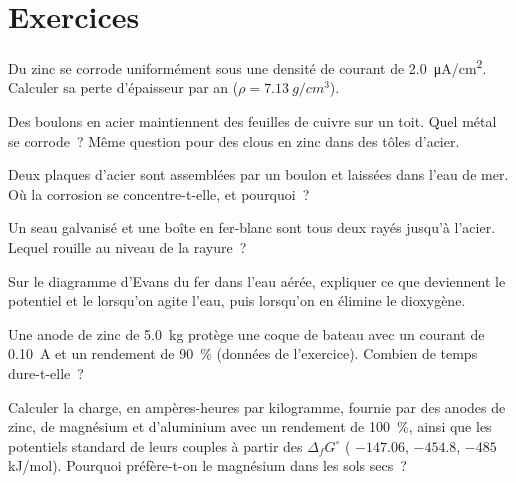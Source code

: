 \section{Exercices}

\begin{exercise}[$\star$]\label{exo:b2:corrosion:1}
Du zinc se corrode uniformément sous une densité de courant de \qty{2.0}{\micro A/cm^2}.
Calculer sa perte d'épaisseur par an ($\rho = \qty{7.13}{g/cm^3}$).
\end{exercise}

\begin{exercise}[$\star$]\label{exo:b2:corrosion:2}
Des boulons en acier maintiennent des feuilles de cuivre sur un toit. Quel métal se corrode~? Même question
pour des clous en zinc dans des tôles d'acier.
\end{exercise}

\begin{exercise}[$\star$]\label{exo:b2:corrosion:3}
Deux plaques d'acier sont assemblées par un boulon et laissées dans l'eau de mer. Où
la corrosion se concentre-t-elle, et pourquoi~?
\end{exercise}

\begin{exercise}[$\star$]\label{exo:b2:corrosion:4}
Un seau galvanisé et une boîte en fer-blanc sont tous deux rayés jusqu'à l'acier. Lequel
rouille au niveau de la rayure~?
\end{exercise}

\begin{exercise}[$\star\star$]\label{exo:b2:corrosion:5}
Sur le diagramme d'Evans du fer dans l'eau aérée, expliquer ce que deviennent le
potentiel et le  lorsqu'on agite l'eau, puis lorsqu'on
en élimine le dioxygène.
\end{exercise}

\begin{exercise}[$\star\star$]\label{exo:b2:corrosion:6}
Une anode de zinc de \qty{5.0}{kg} protège une coque de bateau avec un courant de
\qty{0.10}{A} et un rendement de 90~\% (données de l'exercice). Combien de temps
dure-t-elle~?
\end{exercise}

\begin{exercise}[$\star\star$]\label{exo:b2:corrosion:7}
Calculer la charge, en ampères-heures par kilogramme, fournie par des anodes de zinc, de magnésium
et d'aluminium avec un rendement de 100~\%, ainsi que les potentiels standard de
leurs couples à partir des $\Delta_f G^\circ$ ( $-147.06$,  $-454.8$,
 $-485$ \unit{kJ/mol}). Pourquoi préfère-t-on le magnésium dans les sols secs~?
\end{exercise}

